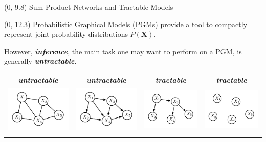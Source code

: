 \documentclass[final]{beamer}
\begin{document}
\begin{frame}{}
  
  \begin{textblock}{80}(0, 9.8)
    Sum-Product Networks and Tractable Models
  \end{textblock}
  
  
  \begin{textblock}{25.7}(0, 12.3)
    \footnotesize
    Probabilistic Graphical Models (PGMs) provide a tool to compactly
    represent joint probability distributions $P(\mathbf{X})$.

    However, \emph{\textbf{inference}}, the main task one may want to perform on a PGM, is generally \emph{\textbf{untractable}}.\bigskip  
    \begin{table}[!ht]
      \setlength{\tabcolsep}{10pt}
      \centering
      \begin{tabular}{c c c c}
        \scriptsize\color{untractable_red}  \textbf{\emph{untractable}} & \scriptsize\color{untractable_red} \textbf{\emph{untractable}}& \scriptsize\color{tractable_green} \emph{\textbf{tractable}} & \scriptsize\color{tractable_green} \emph{\textbf{tractable}}\\

        
        \includegraphics[width=0.22\linewidth]{figures/mrf} &
        \includegraphics[width=0.22\linewidth]{figures/bn} &
        \includegraphics[width=0.22\linewidth]{figures/clt} &
        \includegraphics[width=0.22\linewidth]{figures/nf}\\                                                             
        \addlinespace[-0.2cm]
                                                                            

\end{tabular}
\end{table}
\end{textblock}
\end{frame}
\end{document}
